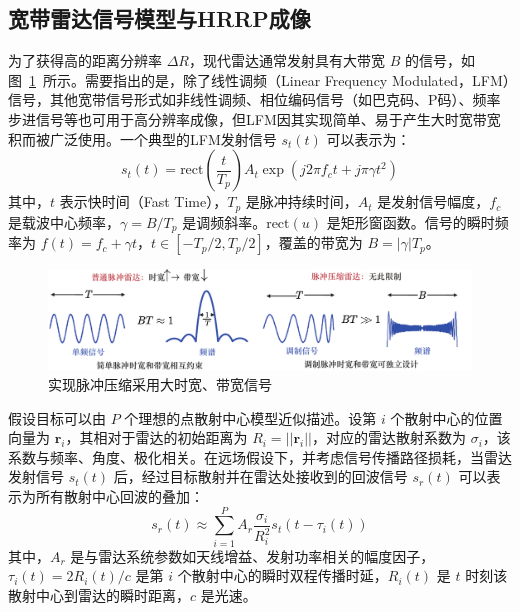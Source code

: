 \subsection{宽带雷达信号模型与HRRP成像}
\label{subsec:hrrp_imaging_model}

为了获得高的距离分辨率 $\Delta R$，现代雷达通常发射具有大带宽 $B$ 的信号，如图~\ref{fig:bt}~所示。需要指出的是，除了线性调频（Linear Frequency Modulated，LFM）信号，其他宽带信号形式如非线性调频、相位编码信号（如巴克码、P码）、频率步进信号等也可用于高分辨率成像，但LFM因其实现简单、易于产生大时宽带宽积而被广泛使用。一个典型的LFM发射信号 $s_t(t)$ 可以表示为：
\begin{equation}
    s_t(t) = \text{rect}\left(\frac{t}{T_p}\right) A_t \exp\left(j 2\pi f_c t + j \pi \gamma t^2\right)
    \label{eq:lfm_signal}
\end{equation}
其中，$t$ 表示快时间（Fast Time），$T_p$ 是脉冲持续时间，$A_t$ 是发射信号幅度，$f_c$ 是载波中心频率，$\gamma = B / T_p$ 是调频斜率。$\text{rect}(u)$ 是矩形窗函数。信号的瞬时频率为 $f(t) = f_c + \gamma t$，$t \in [-T_p/2, T_p/2]$，覆盖的带宽为 $B = |\gamma| T_p$。

\begin{figure}[h]
    \centering
    \includegraphics[width=\linewidth]{figures/bt.pdf}
    \caption{实现脉冲压缩采用大时宽、带宽信号}
    \label{fig:bt}
\end{figure}

假设目标可以由 $P$ 个理想的点散射中心模型近似描述。设第 $i$ 个散射中心的位置向量为 $\mathbf{r}_i$，其相对于雷达的初始距离为 $R_i = ||\mathbf{r}_i||$，对应的雷达散射系数为 $\sigma_i$，该系数与频率、角度、极化相关。在远场假设下，并考虑信号传播路径损耗，当雷达发射信号 $s_t(t)$ 后，经过目标散射并在雷达处接收到的回波信号 $s_r(t)$ 可以表示为所有散射中心回波的叠加：
\begin{equation}
    s_r(t) \approx \sum_{i=1}^{P} A_r \frac{\sigma_i}{R_i^2} s_t\left(t - \tau_i(t)\right)
    \label{eq:received_signal_sum_amplitude}
\end{equation}
其中，$A_r$ 是与雷达系统参数如天线增益、发射功率相关的幅度因子，$\tau_i(t) = 2 R_i(t) / c$ 是第 $i$ 个散射中心的瞬时双程传播时延，$R_i(t)$ 是 $t$ 时刻该散射中心到雷达的瞬时距离，$c$ 是光速。

